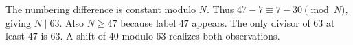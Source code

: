 The numbering difference is constant modulo $N$. Thus $47-7\equiv7-30\pmod N$, giving $N\mid63$. Also $N\ge47$ because label $47$ appears. The only divisor of $63$ at least $47$ is $\boxed{63}$. A shift of $40$ modulo $63$ realizes both observations.
